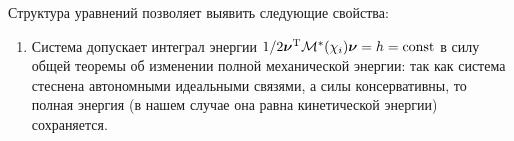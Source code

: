 Структура уравнений позволяет выявить следующие свойства:
\begin{enumerate}
    \item Система допускает интеграл энергии $1/2 \boldsymbol{\mathbf{\nu}}^\mathrm{T}\mathcal{M}^*(\chi_i)\boldsymbol{\mathbf{\nu}} = h = \mathrm{const}$ в силу общей теоремы об изменении полной механической энергии: так как система стеснена автономными идеальными связями, а силы консервативны, то полная энергия (в нашем случае она равна кинетической энергии) сохраняется.
    

\end{enumerate}

